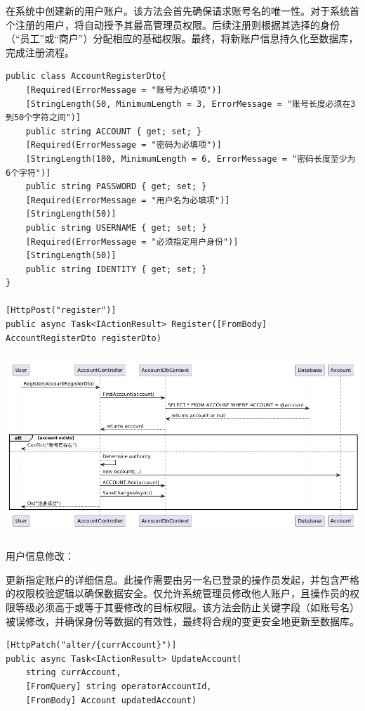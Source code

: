 \documentclass[]{article}
\begin{document}
在系统中创建新的用户账户。该方法会首先确保请求账号名的唯一性。对于系统首个注册的用户，将自动授予其最高管理员权限。后续注册则根据其选择的身份（``员工''或``商户''）分配相应的基础权限。最终，将新账户信息持久化至数据库，完成注册流程。
\begin{verbatim}
public class AccountRegisterDto{
    [Required(ErrorMessage = "账号为必填项")]
    [StringLength(50, MinimumLength = 3, ErrorMessage = "账号长度必须在3到50个字符之间")]
    public string ACCOUNT { get; set; }
    [Required(ErrorMessage = "密码为必填项")]
    [StringLength(100, MinimumLength = 6, ErrorMessage = "密码长度至少为6个字符")]
    public string PASSWORD { get; set; }
    [Required(ErrorMessage = "用户名为必填项")]
    [StringLength(50)]
    public string USERNAME { get; set; }
    [Required(ErrorMessage = "必须指定用户身份")]
    [StringLength(50)]
    public string IDENTITY { get; set; }
}

[HttpPost("register")]
public async Task<IActionResult> Register([FromBody] AccountRegisterDto registerDto)
\end{verbatim}

\includegraphics[width=5.75347in,height=2.69097in]{media/media/image6.png}

用户信息修改：

更新指定账户的详细信息。此操作需要由另一名已登录的操作员发起，并包含严格的权限校验逻辑以确保数据安全。仅允许系统管理员修改他人账户，且操作员的权限等级必须高于或等于其要修改的目标权限。该方法会防止关键字段（如账号名）被误修改，并确保身份等数据的有效性，最终将合规的变更安全地更新至数据库。
\begin{verbatim}
[HttpPatch("alter/{currAccount}")]
public async Task<IActionResult> UpdateAccount(
    string currAccount,
    [FromQuery] string operatorAccountId,
    [FromBody] Account updatedAccount)
\end{verbatim}
\end{document}
